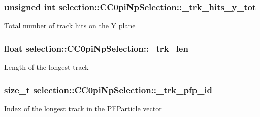 \subsubsection[{\texorpdfstring{\+\_\+trk\+\_\+hits\+\_\+y\+\_\+tot}{_trk_hits_y_tot}}]{\setlength{\rightskip}{0pt plus 5cm}unsigned int selection\+::\+C\+C0pi\+Np\+Selection\+::\+\_\+trk\+\_\+hits\+\_\+y\+\_\+tot\hspace{0.3cm}{\ttfamily [private]}}\hypertarget{classselection_1_1CC0piNpSelection_a76eb07fcb9190709464880c0ea7c4eba}{}\label{classselection_1_1CC0piNpSelection_a76eb07fcb9190709464880c0ea7c4eba}
Total number of track hits on the Y plane 
\subsubsection[{\texorpdfstring{\+\_\+trk\+\_\+len}{_trk_len}}]{\setlength{\rightskip}{0pt plus 5cm}float selection\+::\+C\+C0pi\+Np\+Selection\+::\+\_\+trk\+\_\+len\hspace{0.3cm}{\ttfamily [private]}}\hypertarget{classselection_1_1CC0piNpSelection_aab7945993678b44d7100abac6cc71655}{}\label{classselection_1_1CC0piNpSelection_aab7945993678b44d7100abac6cc71655}
Length of the longest track 
\subsubsection[{\texorpdfstring{\+\_\+trk\+\_\+pfp\+\_\+id}{_trk_pfp_id}}]{\setlength{\rightskip}{0pt plus 5cm}size\+\_\+t selection\+::\+C\+C0pi\+Np\+Selection\+::\+\_\+trk\+\_\+pfp\+\_\+id\hspace{0.3cm}{\ttfamily [private]}}\hypertarget{classselection_1_1CC0piNpSelection_a641e7e656a28a5b31a5c8ab21dad9d3b}{}\label{classselection_1_1CC0piNpSelection_a641e7e656a28a5b31a5c8ab21dad9d3b}
Index of the longest track in the P\+F\+Particle vector 

